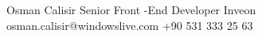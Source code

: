 
\begin{referees}
		{Osman Calisir}
		{Senior Front -End Developer }
		{Inveon}
		{osman.calisir@windowslive.com}
		{+90 531 333 25 63}
\end{referees}